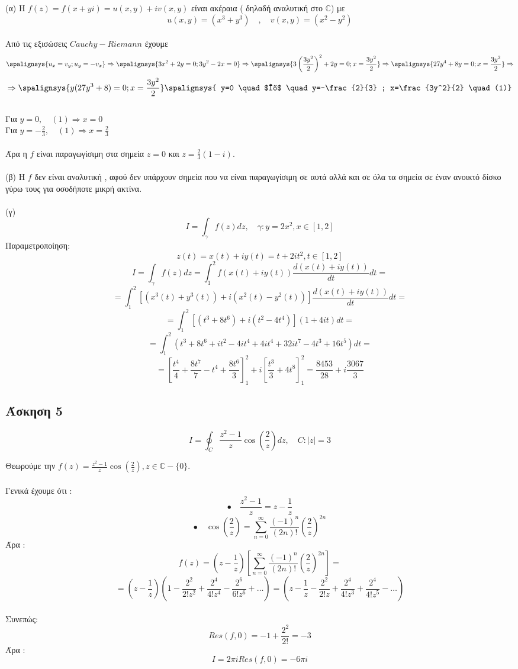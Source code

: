 \documentclass[12pt]{article}
\begin{document}
(α) Η $f(z)=f(x+yi)=u(x,y)+iv(x,y)$ είναι ακέραια ( δηλαδή αναλυτική στο $\mathbb{C}$) με 
$$ u(x,y)=(x^3+y^3) \quad,\quad v(x,y)=(x^2-y^2) $$
\\
Από τις εξισώσεις $Cauchy-Riemann$ έχουμε
\\
\[
\spalignsys {u_x=v_y;u_y=-v_x} \Rightarrow \spalignsys {3x^2+2y=0 ; 3y^2-2x=0} \Rightarrow
\spalignsys { 3\left(\frac{3y^2}{2}\right)^2+2y=0 ; x=\frac{3y^2}{2}} \Rightarrow 
\spalignsys { 27y^4+8y=0 ; x=\frac{3y^2}{2}} \Rightarrow 
\]
\[\Rightarrow
\spalignsys { y(27y^3+8)=0 ; x=\frac{3y^2}{2}} \spalignsys { y=0 \quad $ή$ \quad y=-\frac{2}{3} ; x=\frac{3y^2}{2} \quad (1)}
\]
\\
Για $y=0, \quad (1)\Rightarrow x=0$ \\
Για $y=-\frac{2}{3}, \quad (1)\Rightarrow x=\frac{2}{3} $
\\ \\
Άρα η $f$ είναι παραγωγίσιμη στα σημεία $z=0$ και $z=\frac{2}{3}(1-i)$.
\\ \\
(β)
Η $f$ δεν είναι αναλυτική , αφού δεν υπάρχουν σημεία που να είναι παραγωγίσιμη σε αυτά αλλά και σε όλα τα σημεία σε έναν ανοικτό δίσκο γύρω τους για οσοδήποτε μικρή ακτίνα.
\\ \\
(γ)
$$ I= \int_\gamma f(z)dz, \quad \gamma:y=2x^2,x\in[1,2] $$
Παραμετροποίηση:
$$ z(t)=x(t)+iy(t)=t+2it^2,t\in[1,2] $$
$$ I= \int_\gamma f(z)dz= \int_{1}^{2} f(x(t)+iy(t))\frac {d(x(t)+iy(t))}{dt} dt = $$ 
$$= \int_{1}^{2} [(x^3(t)+y^3(t))+i(x^2(t)-y^2(t))]\frac {d(x(t)+iy(t))}{dt} dt= $$
$$= \int_{1}^{2} [(t^3+8t^6)+i(t^2-4t^4)](1+4it) dt= $$
$$= \int_{1}^{2} (t^3+8t^6+it^2-4it^4+4it^4+32it^7-4t^3+16t^5) dt= $$
$$= \left[\frac{t^4}{4}+\frac{8t^7}{7}-t^4+\frac{8t^6}{3}\right]^{2}_{1}+
i\left[\frac{t^3}{3}+4t^8 \right]^{2}_{1}= \frac{8453}{28}+i\frac{3067}{3}$$

\newpage
 \subsection{Άσκηση 5}
$$Ι=\oint_{C} \frac{z^2-1}{z}\cos{\left(\frac{2}{z}\right)} dz ,\quad C:|z|=3$$

Θεωρούμε την  $f(z)=\frac{z^2-1}{z}\cos{\left(\frac{2}{z}\right)},z\in\mathbb{C}-\{0\}$.
\\ \\
Γενικά έχουμε ότι :
$$\bullet \quad \frac{z^2-1}{z}=z-\frac{1}{z}$$ 
$$\bullet \quad \cos{\left(\frac{2}{z}\right)} =\sum_{n=0}^\infty \frac{(-1)^n}{(2n)!}\left(\frac{2}{z}\right)^{2n} $$ 
Άρα : 
$$ f(z)=\left(z-\frac{1}{z} \right)\left[ \sum_{n=0}^\infty \frac{(-1)^n}{(2n)!}\left(\frac{2}{z}\right)^{2n} \right]= $$
$$ = \left(z-\frac{1}{z} \right)\left( 1-\frac{2^2}{2!z^2}+\frac{2^4}{4!z^4}-\frac{2^6}{6!z^6} +\ldots \right) = \left( z-\frac{1}{z}-\frac{2^2}{2!z}+\frac{2^4}{4!z^3}+\frac{2^4}{4!z^5} -\ldots \right) $$
\\
Συνεπώς:
$$
Res(f,0)=-1+\frac{2^2}{2!}=-3$$
Άρα : $$ Ι=2\pi i Res(f,0) = -6 \pi i $$
\newpage
\end{document}
